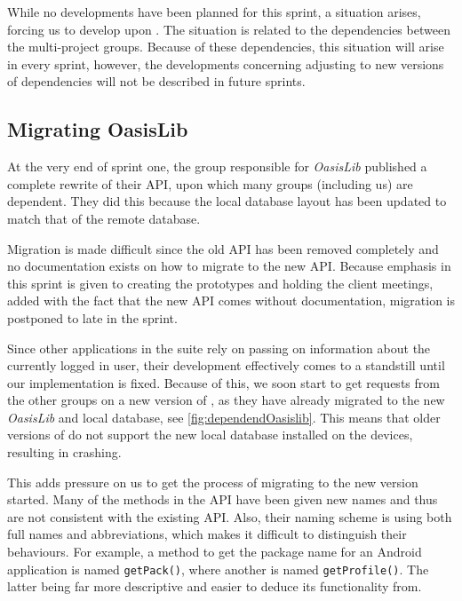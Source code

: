 While no developments have been planned for this sprint, a situation arises, forcing us to develop upon \launcher.
The situation is related to the dependencies between the multi-project groups.
Because of these dependencies, this situation will arise in every sprint, however, the developments concerning adjusting to new versions of dependencies will not be described in future sprints.

\subsection{Migrating OasisLib}\label{sec:oasismigration}
At the very end of sprint one, the group responsible for \textit{OasisLib} published a complete rewrite of their API, upon which many groups (including us) are dependent.
They did this because the local database layout has been updated to match that of the remote database.

Migration is made difficult since the old API has been removed completely and no documentation exists on how to migrate to the new API.
Because emphasis in this sprint is given to creating the prototypes and holding the client meetings, added with the fact that the new API comes without documentation, migration is postponed to late in the sprint.

Since other applications in the \giraf suite rely on \launcher passing on information about the currently logged in user, their development effectively comes to a standstill until our implementation is fixed.
Because of this, we soon start to get requests from the other groups on a new version of \launcher, as they have already migrated to the new \textit{OasisLib} and local database, see \cref{fig:dependendOasislib}.
This means that older versions of \launcher do not support the new local database installed on the devices, resulting in \launcher crashing.


This adds pressure on us to get the process of migrating to the new version started.
Many of the methods in the API have been given new names and thus are not consistent with the existing API.
Also, their naming scheme is using both full names and abbreviations, which makes it difficult to distinguish their behaviours.
For example, a method to get the package name for an Android application is named \lstinline{getPack()}, where another is named \lstinline{getProfile()}.
The latter being far more descriptive and easier to deduce its functionality from.

